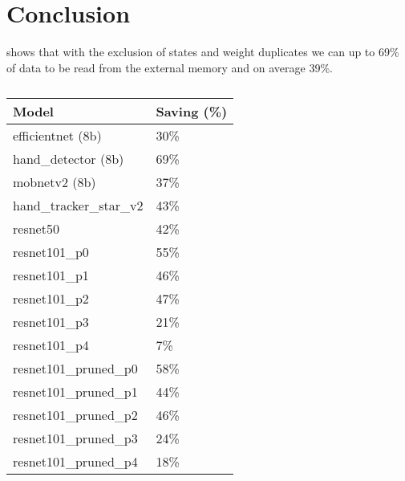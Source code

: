 \section{Conclusion}

 shows that with the exclusion of states and weight duplicates we can up to 69\% of data to be read from the external memory and on average 39\%.

\begin{table}[hbtp]
\centering
\begin{tabular}{@{}ll@{}}
\toprule
\textbf{Model}          & \textbf{Saving (\%)} \\ \midrule
efficientnet (8b)       & 30\%                 \\
hand\_detector (8b)     & 69\%                 \\
mobnetv2 (8b)           & 37\%                 \\
hand\_tracker\_star\_v2 & 43\%                 \\
resnet50                & 42\%                 \\
resnet101\_p0           & 55\%                 \\
resnet101\_p1           & 46\%                 \\
resnet101\_p2           & 47\%                 \\
resnet101\_p3           & 21\%                 \\
resnet101\_p4           & 7\%                  \\
resnet101\_pruned\_p0   & 58\%                 \\
resnet101\_pruned\_p1   & 44\%                 \\
resnet101\_pruned\_p2   & 46\%                 \\
resnet101\_pruned\_p3   & 24\%                 \\
resnet101\_pruned\_p4   & 18\%                 \\ \bottomrule
\end{tabular}
\caption{}
\label{tab:savings}
\end{table}